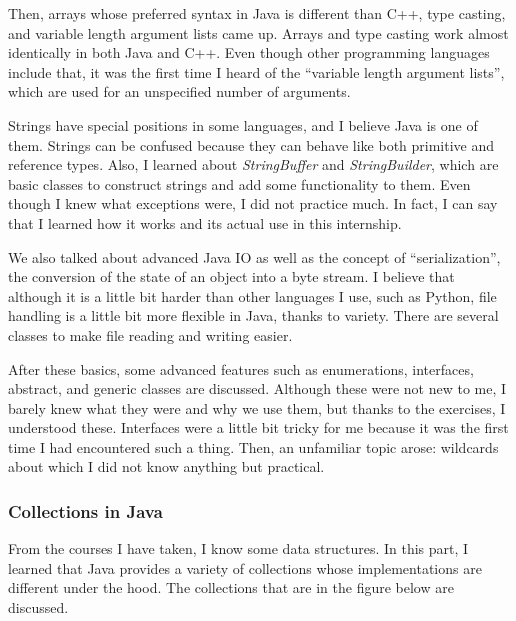 Then, arrays whose preferred syntax in Java is different than C++, type casting, and variable length argument lists came up. Arrays and type casting work almost identically in both Java and C++. Even though other programming languages include that, it was the first time I heard of the ``variable length argument lists'', which are used for an unspecified number of arguments.

Strings have special positions in some languages, and I believe Java is one of them. Strings can be confused because they can behave like both primitive and reference types. Also, I learned about \textit{StringBuffer} and \textit{StringBuilder}, which are basic classes to construct strings and add some functionality to them. Even though I knew what exceptions were, I did not practice much. In fact, I can say that I learned how it works and its actual use in this internship.

We also talked about advanced Java IO as well as the concept of ``serialization'',  the conversion of the state of an object into a byte stream. I believe that although it is a little bit harder than other languages I use, such as Python, file handling is a little bit more flexible in Java, thanks to variety. There are several classes to make file reading and writing easier.

After these basics, some advanced features such as enumerations, interfaces, abstract, and generic classes are discussed. Although these were not new to me, I barely knew what they were and why we use them, but thanks to the exercises, I understood these. Interfaces were a little bit tricky for me because it was the first time I had encountered such a thing. Then, an unfamiliar topic arose: wildcards about which I did not know anything but practical.

\subsubsection{Collections in Java}

From the courses I have taken, I know some data structures. In this part, I learned that Java provides a variety of collections whose implementations are different under the hood. The collections that are in the figure below are discussed.  

